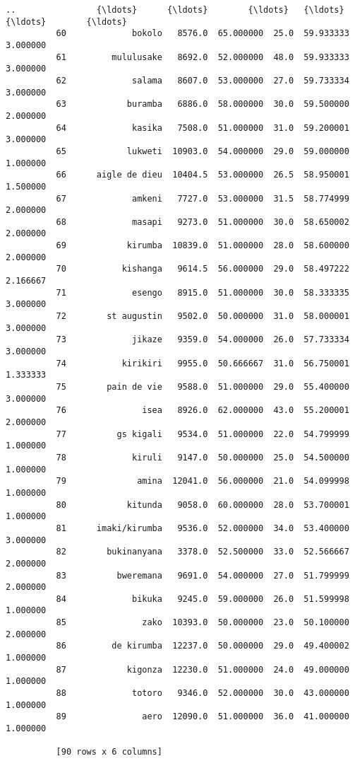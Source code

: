 \documentclass[11pt]{article}
\begin{document}
\begin{Verbatim}[commandchars=\\\{\}]
          ..                {\ldots}      {\ldots}        {\ldots}   {\ldots}        {\ldots}        {\ldots}
          60             bokolo   8576.0  65.000000  25.0  59.933333   3.000000
          61         mululusake   8692.0  52.000000  48.0  59.933333   3.000000
          62             salama   8607.0  53.000000  27.0  59.733334   3.000000
          63            buramba   6886.0  58.000000  30.0  59.500000   2.000000
          64             kasika   7508.0  51.000000  31.0  59.200001   3.000000
          65            lukweti  10903.0  54.000000  29.0  59.000000   1.000000
          66      aigle de dieu  10404.5  53.000000  26.5  58.950001   1.500000
          67             amkeni   7727.0  53.000000  31.5  58.774999   2.000000
          68             masapi   9273.0  51.000000  30.0  58.650002   2.000000
          69            kirumba  10839.0  51.000000  28.0  58.600000   2.000000
          70           kishanga   9614.5  56.000000  29.0  58.497222   2.166667
          71             esengo   8915.0  51.000000  30.0  58.333335   3.000000
          72        st augustin   9502.0  50.000000  31.0  58.000001   3.000000
          73             jikaze   9359.0  54.000000  26.0  57.733334   3.000000
          74           kirikiri   9955.0  50.666667  31.0  56.750001   1.333333
          75        pain de vie   9588.0  51.000000  29.0  55.400000   3.000000
          76               isea   8926.0  62.000000  43.0  55.200001   2.000000
          77          gs kigali   9534.0  51.000000  22.0  54.799999   1.000000
          78             kiruli   9147.0  50.000000  25.0  54.500000   1.000000
          79              amina  12041.0  56.000000  21.0  54.099998   1.000000
          80            kitunda   9058.0  60.000000  28.0  53.700001   1.000000
          81      imaki/kirumba   9536.0  52.000000  34.0  53.400000   3.000000
          82        bukinanyana   3378.0  52.500000  33.0  52.566667   2.000000
          83          bweremana   9691.0  54.000000  27.0  51.799999   2.000000
          84             bikuka   9245.0  59.000000  26.0  51.599998   1.000000
          85               zako  10393.0  50.000000  23.0  50.100000   2.000000
          86         de kirumba  12237.0  50.000000  29.0  49.400002   1.000000
          87            kigonza  12230.0  51.000000  24.0  49.000000   1.000000
          88             totoro   9346.0  52.000000  30.0  43.000000   1.000000
          89               aero  12090.0  51.000000  36.0  41.000000   1.000000
          
          [90 rows x 6 columns]
\end{Verbatim}
        
\end{document}
